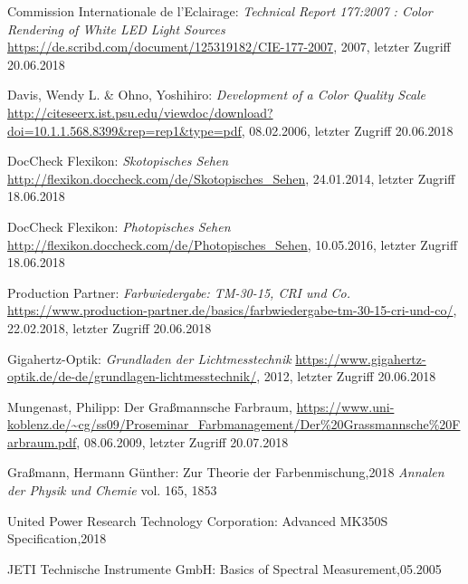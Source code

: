 \begin{thebibliography}{}
Commission Internationale de l'Eclairage:
\emph{\glqq Technical Report 177:2007 : Color Rendering of White LED Light Sources\grqq}
\url{https://de.scribd.com/document/125319182/CIE-177-2007}, 2007, letzter Zugriff 20.06.2018

Davis, Wendy L. \& Ohno, Yoshihiro:
\emph{\glqq Development of a Color Quality Scale\grqq}
\url{http://citeseerx.ist.psu.edu/viewdoc/download?doi=10.1.1.568.8399&rep=rep1&type=pdf}, 08.02.2006, letzter Zugriff 20.06.2018

DocCheck Flexikon:
\emph{\glqq Skotopisches Sehen\grqq}
\url{http://flexikon.doccheck.com/de/Skotopisches_Sehen}, 24.01.2014, letzter Zugriff 18.06.2018

DocCheck Flexikon:
\emph{\glqq Photopisches Sehen\grqq}
\url{http://flexikon.doccheck.com/de/Photopisches_Sehen}, 10.05.2016, letzter Zugriff 18.06.2018

Production Partner:
\emph{\glqq Farbwiedergabe: TM-30-15, CRI und Co.\grqq}
\url{https://www.production-partner.de/basics/farbwiedergabe-tm-30-15-cri-und-co/}, 22.02.2018, letzter Zugriff 20.06.2018

Gigahertz-Optik:
\emph{\glqq Grundladen der Lichtmesstechnik\grqq}
\url{https://www.gigahertz-optik.de/de-de/grundlagen-lichtmesstechnik/}, 2012, letzter Zugriff 20.06.2018



Mungenast, Philipp:
\glqq Der Graßmannsche Farbraum\grqq ,
\url{https://www.uni-koblenz.de/~cg/ss09/Proseminar_Farbmanagement/Der\%20Grassmannsche\%20Farbraum.pdf}, 08.06.2009, letzter Zugriff 20.07.2018


Graßmann, Hermann Günther:
\glqq Zur Theorie der Farbenmischung\grqq ,2018
\emph{Annalen der Physik und Chemie} vol. 165, 1853

United Power Research Technology Corporation:
\glqq Advanced MK350S Specification\grqq ,2018


JETI Technische Instrumente GmbH:
\glqq Basics of Spectral Measurement\grqq ,05.2005


\end{thebibliography}
